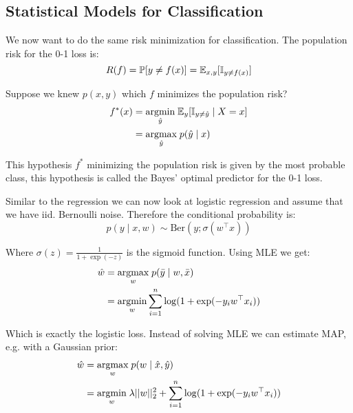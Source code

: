 \subsection{Statistical Models for Classification}

We now want to do the same risk minimization for classification. The population risk for the 0-1 loss is:
$$R(f) = \mathbb P[y \neq f(x)] = \mathbb{E}_{x,y}[\mathbb I_{y \neq f(x)}]$$

Suppose we knew $p(x,y)$ which $f$ minimizes the population risk?
\begin{align*}
	f^*(x) &= \underset{\hat y}{\text{argmin}} \; \mathbb{E}_y [\mathbb I_{y \neq \hat y} \; | \; X = x] \\
	&= \underset{\hat y}{\text{argmax}} \; p(\hat y \; | \; x)
\end{align*}

This hypothesis $f^*$ minimizing the population risk is given by the most probable class, this hypothesis is called the Bayes' optimal predictor for the 0-1 loss.

Similar to the regression we can now look at logistic regression and assume that we have iid. Bernoulli noise. Therefore the conditional probability is:
$$p(y \; | \; x,w) \sim \text{Ber}(y; \sigma(w^\top x))$$

Where $\sigma(z) = \frac{1}{1 + \exp(-z)}$ is the sigmoid function. Using MLE we get:
\begin{align*}
	\hat w &= \underset{w}{\text{argmax}} \; p(\bar y \; | \; w, \bar x) \\
	&= \underset{w}{\text{argmin}} \sum_{i = 1}^n \log (1 + \exp(-y_i w^\top x_i))
\end{align*}

Which is exactly the logistic loss. Instead of solving MLE we can estimate MAP, e.g. with a Gaussian prior:
\begin{align*}
	\hat w &= \underset{w}{\text{argmax}} \; p(w \; | \; \hat x, \hat y) \\
	&= \underset{w}{\text{argmin}} \; \lambda ||w||_2^2 + \sum_{i = 1}^n \log (1 + \exp(-y_i w^\top x_i))
\end{align*}






